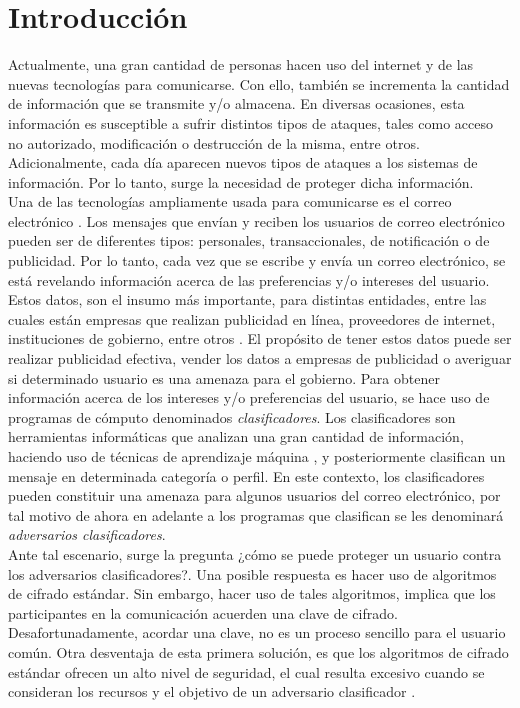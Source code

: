 \documentclass[12pt,oneside,onecolumn,openany]{report}
\begin{document}
\chapter*{Introducci\'on}
\label{cha:introduccion}
Actualmente, una gran cantidad de personas hacen uso del internet y de las nuevas tecnologías para comunicarse. Con ello, también se incrementa la cantidad de información que se transmite y/o almacena. En diversas ocasiones, esta información es susceptible a sufrir distintos tipos de ataques, tales como acceso no autorizado, modificación o destrucción de la misma, entre otros. Adicionalmente, cada día aparecen nuevos tipos de ataques a los sistemas de información. Por lo tanto, surge la necesidad de proteger dicha información.\\
Una de las tecnologías ampliamente usada para comunicarse es el correo electrónico \cite{@}. Los mensajes que envían y reciben los usuarios de correo electrónico pueden ser de diferentes tipos: personales, transaccionales, de notificación o de publicidad. Por lo tanto, cada vez que se escribe y envía un correo electrónico, se está revelando información acerca de las preferencias y/o intereses del usuario. Estos datos, son el insumo más importante, para distintas entidades, entre las cuales están empresas que realizan publicidad en línea, proveedores de internet, instituciones de gobierno, entre otros \cite{sp}.
El propósito de tener estos datos puede ser realizar publicidad efectiva, vender los datos a empresas de publicidad o averiguar si determinado usuario es una amenaza para el gobierno. Para obtener información acerca de los intereses y/o preferencias del usuario, se hace uso de programas de cómputo denominados \textit{clasificadores}. Los clasificadores son herramientas informáticas que analizan una gran cantidad de información, haciendo uso de técnicas de aprendizaje máquina \cite{stanford}, y posteriormente clasifican un mensaje en determinada categoría o perfil. 
En este contexto, los clasificadores pueden constituir una amenaza para algunos usuarios del correo electrónico, por tal motivo de ahora en adelante a los programas que clasifican se les denominará \textit{adversarios clasificadores}.\\
Ante tal escenario, surge la pregunta ¿cómo se puede proteger un usuario contra los adversarios clasificadores?. Una posible respuesta es hacer uso de algoritmos de cifrado estándar. Sin embargo, hacer uso de tales algoritmos, implica que los participantes en la comunicación acuerden una clave de cifrado. Desafortunadamente, acordar una clave, no es un proceso sencillo para el usuario común. Otra desventaja de esta primera solución, es que los algoritmos de cifrado estándar ofrecen un alto nivel de seguridad, el cual resulta excesivo cuando se consideran los recursos y el objetivo de un adversario clasificador \cite{clas}.
\end{document}
